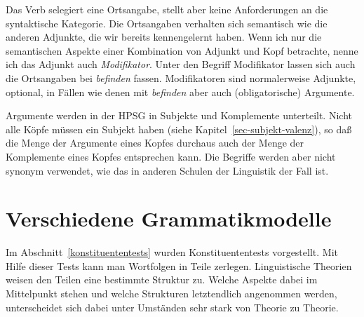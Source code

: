 Das Verb selegiert eine Ortsangabe, stellt aber keine Anforderungen an die syntaktische
Kategorie. Die Ortsangaben verhalten sich semantisch wie die anderen Adjunkte, die wir bereits
kennengelernt haben. Wenn ich nur die semantischen Aspekte einer Kombination von Adjunkt und Kopf
betrachte, nenne ich das Adjunkt auch \emph{Modifikator}. Unter den Begriff Modifikator lassen sich
auch die Ortsangaben bei \emph{befinden} fassen.
Modifikatoren sind normalerweise Adjunkte, \dash optional, in Fällen wie denen mit \emph{befinden} aber auch
(obligatorische) Argumente.

Argumente werden in der HPSG in Subjekte und Komplemente
unterteilt. Nicht alle Köpfe müssen ein Subjekt haben (siehe Kapitel~\ref{sec-subjekt-valenz}),
so daß die Menge der Argumente eines Kopfes durchaus auch der Menge der Komplemente eines Kopfes entsprechen
kann. Die Begriffe werden aber nicht synonym verwendet, wie das in anderen Schulen
der Linguistik der Fall ist.
{}



\section{Verschiedene Grammatikmodelle}
\label{sec-grammatikmodelle}

Im Abschnitt~\ref{konstituententests} wurden Konstituententests vorgestellt. Mit Hilfe dieser Tests kann
man Wortfolgen in Teile zerlegen. Linguistische Theorien weisen den Teilen eine bestimmte
Struktur zu. Welche Aspekte dabei im Mittelpunkt stehen und welche Strukturen letztendlich
angenommen werden, unterscheidet sich dabei unter Umständen sehr stark von Theorie zu Theorie.


